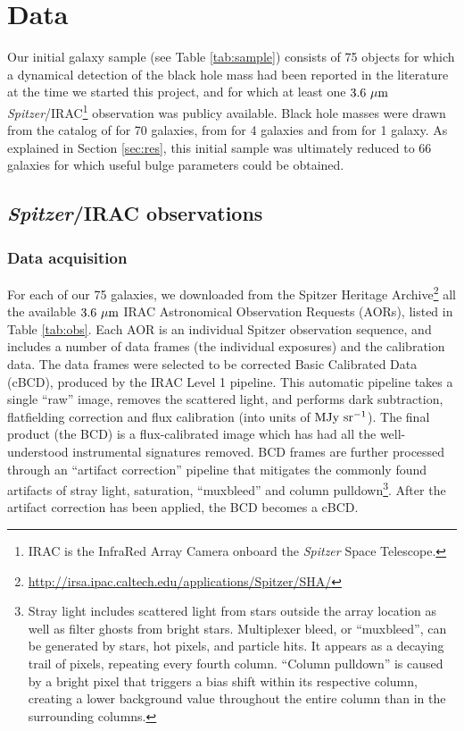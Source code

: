 \documentclass[preprint2]{emulateapj}
\begin{document}
\section{Data}
\label{sec:data}
Our initial galaxy sample (see Table \ref{tab:sample}) consists of 75 objects for which a dynamical detection of the black hole mass 
had been reported in the literature at the time we started this project, 
and for which at least one $3.6~\rm \mu m$ \emph{Spitzer}/IRAC\footnote{IRAC is the InfraRed Array Camera onboard the \emph{Spitzer} Space Telescope.} 
observation was publicy available.
Black hole masses were drawn from the catalog of \citet{grahamscott2013} for 70 galaxies,
from \citet{rusli2013bhmassesDM} for 4 galaxies and from \citet{greenhill2003} for 1 galaxy. 
As explained in Section \ref{sec:res}, 
this initial sample was ultimately reduced to 66 galaxies for which useful bulge parameters could be obtained.






\subsection{\emph{Spitzer}/IRAC observations}
\subsubsection{Data acquisition}
For each of our 75 galaxies, we downloaded from the 
Spitzer Heritage Archive\footnote{\url{http://irsa.ipac.caltech.edu/applications/Spitzer/SHA/}} 
all the available $3.6~\rm \mu m$ IRAC Astronomical Observation Requests (AORs), 
listed in Table \ref{tab:obs}.
Each AOR is an individual Spitzer observation sequence, and
includes a number of data frames (the individual exposures) and the calibration data.
The data frames were selected to be %
corrected Basic Calibrated Data (cBCD), produced by the IRAC Level 1 pipeline. 
This automatic pipeline takes a single ``raw'' image, removes the scattered light, 
and performs dark subtraction, flatfielding correction and flux calibration (into units of $\rm MJy~sr^{-1}$). 
The final product (the BCD) is a flux-calibrated image which has had all the well-understood instrumental signatures removed.
BCD frames are further processed through an ``artifact correction'' pipeline 
that mitigates the commonly found artifacts of stray light, saturation, ``muxbleed'' and column pulldown\footnote{Stray light 
includes scattered light from stars outside the array location as well as filter ghosts from bright stars. 
Multiplexer bleed, or ``muxbleed'', can be generated by stars, hot pixels, and particle hits.
It appears as a decaying trail of pixels, repeating every fourth column.
``Column pulldown'' is caused by a bright pixel that triggers a bias shift within its respective column, 
creating a lower background value throughout the entire column than in the surrounding columns.}.
After the artifact correction has been applied, the BCD becomes a cBCD.
\end{document}
